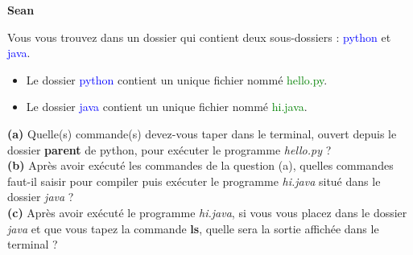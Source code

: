 \begin{Exercice}[10 minutes]\textbf{Sean}


Vous vous trouvez dans un dossier qui contient deux sous-dossiers : \faFolder[regular] \textcolor{blue}{python} et \faFolder[regular] \textcolor{blue}{java}.
\begin{itemize}
    \item[$\bullet$] Le dossier \textcolor{blue}{python} contient un unique fichier nommé \textcolor{green}{hello.py}.
    \item[$\bullet$] Le dossier \textcolor{blue}{java} contient un unique fichier nommé \textcolor{green}{hi.java}.
\end{itemize}

\textbf{(a)} Quelle(s) commande(s) devez-vous taper dans le terminal, ouvert depuis le dossier \textbf{parent} de python, pour exécuter le programme \textit{hello.py} ? \\ 

\textbf{(b)} Après avoir exécuté les commandes de la question (a), quelles commandes faut-il saisir pour compiler puis exécuter le programme \textit{hi.java} situé dans le dossier \textit{java} ? \\ 

\textbf{(c)} Après avoir exécuté le programme \textit{hi.java}, si vous vous placez dans le dossier \textit{java} et que vous tapez la commande \textbf{ls}, quelle sera la sortie affichée dans le terminal ?











\end{Exercice}
